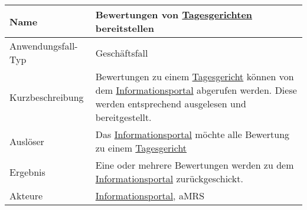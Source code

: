 \begin{table}[H]
    \centering
    \label{bewertungenbereitstellen}
    \begin{tabularx}{\textwidth}{| l | X |}
        \hline
        Name               & Bewertungen von \hyperref[gls:tagesgericht]{Tagesgerichten} bereitstellen                                                                                                                                      \\
        \hline
        Anwendungsfall-Typ & Geschäftsfall                                                                                                                                                                                                  \\
        \hline
        Kurzbeschreibung   & Bewertungen zu einem \hyperref[gls:tagesgericht]{Tagesgericht} können von dem \hyperref[gls:informationsportal]{Informationsportal} abgerufen werden. Diese werden entsprechend ausgelesen und bereitgestellt. \\
        \hline
        Auslöser           & Das \hyperref[gls:informationsportal]{Informationsportal} möchte alle Bewertung zu einem \hyperref[gls:tagesgericht]{Tagesgericht}                                                                             \\
        \hline
        Ergebnis           & Eine oder mehrere Bewertungen werden zu dem \hyperref[gls:informationsportal]{Informationsportal} zurückgeschickt.                                                                                             \\
        \hline
        Akteure            & \hyperref[gls:informationsportal]{Informationsportal}, \ac{aMRS}                                                                                                                                               \\
        \hline
    \end{tabularx}
\end{table}

